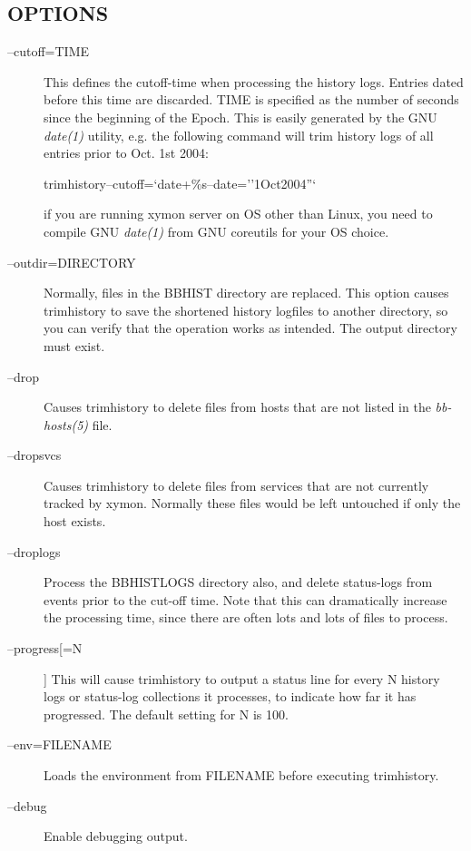  
\subsection{OPTIONS}
\begin{description}
\item[--cutoff=TIME] This defines the cutoff-time when processing the
  history logs. Entries dated before this time are discarded. TIME is
  specified as the number of seconds since the beginning of the
  Epoch. This is easily generated by the GNU \emph{date(1)} utility,
  e.g. the following command will trim history logs of all entries
  prior to Oct. 1st 2004:  

  
trimhistory--cutoff=`date+\%s--date=''1Oct2004''` 

  if you are running xymon server on OS other than Linux, you need to 
  compile GNU \emph{date(1)} from GNU coreutils for your OS choice.

\item[--outdir=DIRECTORY] Normally, files in the BBHIST directory are
  replaced. This option causes trimhistory to save the shortened
  history logfiles to another directory, so you can verify that the
  operation works as intended. The output directory must exist. 


 

\item[--drop] Causes trimhistory to delete files from hosts that are
  not listed in the \emph{bb-hosts(5)} file. 

 

\item[--dropsvcs] Causes trimhistory to delete files from services
  that are not currently tracked by xymon. Normally these files would
  be left untouched if only the host exists. 

 

\item[--droplogs] Process the BBHISTLOGS directory also, and delete
  status-logs from events prior to the cut-off time. Note that this
  can dramatically increase the processing time, since there are often
  lots and lots of files to process. 


 

\item[--progress[=N]] This will cause trimhistory to output a status
  line for every N history logs or status-log collections it
  processes, to indicate how far it has progressed. The default
  setting for N is 100. 


 

\item[--env=FILENAME] Loads the environment from FILENAME before executing trimhistory. 

 

\item[--debug] Enable debugging output. 

 
\end{description}
